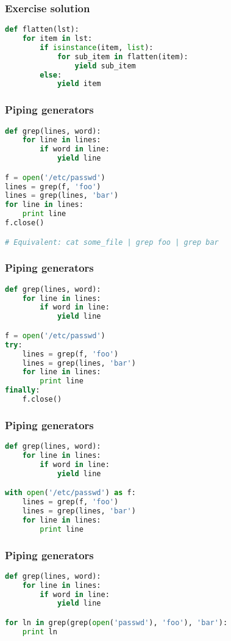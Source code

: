 \documentclass{beamer}
\begin{document}
\begin{frame}[fragile]
\frametitle{Exercise solution}
\begin{lstlisting}[language=python]
def flatten(lst):
    for item in lst:
        if isinstance(item, list):
            for sub_item in flatten(item):
                yield sub_item
        else:
            yield item

\end{lstlisting}
\end{frame}




\begin{frame}[fragile]
\frametitle{Piping generators}
\begin{lstlisting}[language=python]
def grep(lines, word):
    for line in lines:
        if word in line:
            yield line

f = open('/etc/passwd')
lines = grep(f, 'foo')
lines = grep(lines, 'bar')
for line in lines:
    print line
f.close()

# Equivalent: cat some_file | grep foo | grep bar
\end{lstlisting}
\end{frame}

\begin{frame}[fragile]
\frametitle{Piping generators}
\begin{lstlisting}[language=python]
def grep(lines, word):
    for line in lines:
        if word in line:
            yield line

f = open('/etc/passwd')
try:
    lines = grep(f, 'foo')
    lines = grep(lines, 'bar')
    for line in lines:
        print line
finally:
    f.close()
\end{lstlisting}
\end{frame}


\begin{frame}[fragile]
\frametitle{Piping generators}
\begin{lstlisting}[language=python]
def grep(lines, word):
    for line in lines:
        if word in line:
            yield line

with open('/etc/passwd') as f:
    lines = grep(f, 'foo')
    lines = grep(lines, 'bar')
    for line in lines:
        print line
\end{lstlisting}
\end{frame}


\begin{frame}[fragile]
\frametitle{Piping generators}
\begin{lstlisting}[language=python]
def grep(lines, word):
    for line in lines:
        if word in line:
            yield line

for ln in grep(grep(open('passwd'), 'foo'), 'bar'):
    print ln
\end{lstlisting}

\end{frame}
\end{document}
